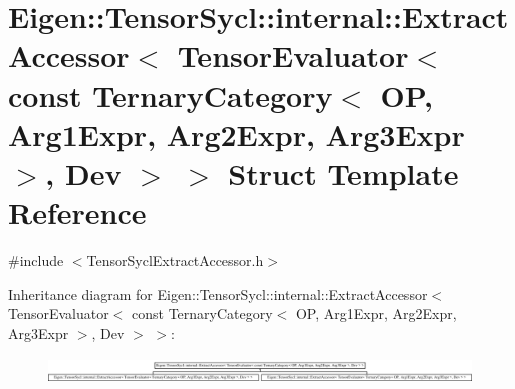\hypertarget{struct_eigen_1_1_tensor_sycl_1_1internal_1_1_extract_accessor_3_01_tensor_evaluator_3_01const_010235c7f46e01985cfd9706474c83e49e}{}\section{Eigen\+:\+:Tensor\+Sycl\+:\+:internal\+:\+:Extract\+Accessor$<$ Tensor\+Evaluator$<$ const Ternary\+Category$<$ OP, Arg1\+Expr, Arg2\+Expr, Arg3\+Expr $>$, Dev $>$ $>$ Struct Template Reference}
\label{struct_eigen_1_1_tensor_sycl_1_1internal_1_1_extract_accessor_3_01_tensor_evaluator_3_01const_010235c7f46e01985cfd9706474c83e49e}


{\ttfamily \#include $<$Tensor\+Sycl\+Extract\+Accessor.\+h$>$}

Inheritance diagram for Eigen\+:\+:Tensor\+Sycl\+:\+:internal\+:\+:Extract\+Accessor$<$ Tensor\+Evaluator$<$ const Ternary\+Category$<$ OP, Arg1\+Expr, Arg2\+Expr, Arg3\+Expr $>$, Dev $>$ $>$\+:\begin{figure}[H]
\begin{center}
\leavevmode
\includegraphics[height=0.695652cm]{struct_eigen_1_1_tensor_sycl_1_1internal_1_1_extract_accessor_3_01_tensor_evaluator_3_01const_010235c7f46e01985cfd9706474c83e49e}
\end{center}
\end{figure}
